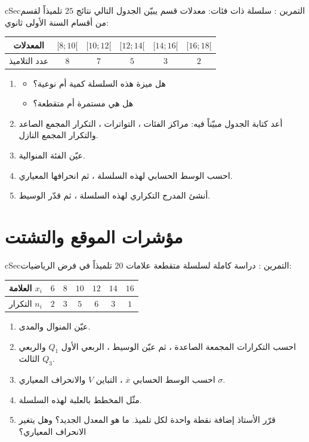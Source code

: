 \documentclass[12pt,a4paper]{article}
\newenvironment{BOX}[2]{\begin{otherlanguage}{english}\begin{arbox}{#1}{#2}}{\end{arbox}\end{otherlanguage}}
\newcounter{exo}
\newenvironment{tamrin}[1]{\stepcounter{exo}\begin{BOX}{cSec}{التمرين \theexo: #1}}{\end{BOX}}
\newenvironment{sq}{\begin{itemize}[leftmargin=2.4em,itemsep=3pt]}{\end{itemize}}
\newcommand{\qa}{\item[(أ)]}\newcommand{\qb}{\item[(ب)]}\newcommand{\qc}{\item[(جـ)]}\newcommand{\qd}{\item[(د)]}\newcommand{\qe}{\item[(هـ)]}
\begin{document}
\begin{tamrin}{سلسلة ذات فئات: معدلات قسم}
يبيّن الجدول التالي نتائج $25$ تلميذاً لقسم من أقسام السنة الأولى ثانوي:
\begin{center}
\renewcommand{\arraystretch}{1.45}
\begin{tabular}{|c|c|c|c|c|c|}\hline
\cellcolor{cSec!12}المعدلات & $[8;10[$ & $[10;12[$ & $[12;14[$ & $[14;16[$ & $[16;18[$\\\hline
\cellcolor{cSec!12}عدد التلاميذ & $8$ & $7$ & $5$ & $3$ & $2$\\\hline
\end{tabular}
\end{center}
\begin{enumerate}
\item
\begin{sq}
\qa هل ميزة هذه السلسلة كمية أم نوعية؟
\qb هل هي مستمرة أم متقطعة؟
\end{sq}
\item أعد كتابة الجدول مبيّناً فيه: مراكز الفئات ، التواترات ، التكرار المجمع الصاعد والتكرار المجمع النازل.
\item عيّن الفئة المنوالية.
\item احسب الوسط الحسابي لهذه السلسلة ، ثم انحرافها المعياري.
\item أنشئ المدرج التكراري لهذه السلسلة ، ثم قدّر الوسيط.
\end{enumerate}
\end{tamrin}

\section{مؤشرات الموقع والتشتت}
\begin{tamrin}{دراسة كاملة لسلسلة متقطعة}
علامات $20$ تلميذاً في فرض الرياضيات:
\begin{center}
\renewcommand{\arraystretch}{1.45}
\begin{tabular}{|c|c|c|c|c|c|c|}\hline
\cellcolor{cSec!12}العلامة $x_i$ & $6$ & $8$ & $10$ & $12$ & $14$ & $16$\\\hline
\cellcolor{cSec!12}التكرار $n_i$ & $2$ & $3$ & $5$ & $6$ & $3$ & $1$\\\hline
\end{tabular}
\end{center}
\begin{enumerate}
\item عيّن المنوال والمدى.
\item احسب التكرارات المجمعة الصاعدة ، ثم عيّن الوسيط ، الربعي الأول $Q_1$ والربعي الثالث $Q_3$.
\item احسب الوسط الحسابي $\overline x$ ، التباين $V$ والانحراف المعياري $\sigma$.
\item مثّل المخطط بالعلبة لهذه السلسلة.
\item قرّر الأستاذ إضافة نقطة واحدة لكل تلميذ. ما هو المعدل الجديد؟ وهل يتغير الانحراف المعياري؟
\end{enumerate}
\end{tamrin}
\end{document}
